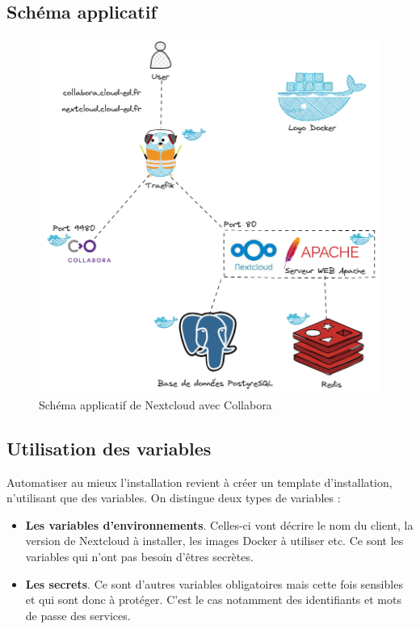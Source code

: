 \documentclass[12pt, a4paper, twoside]{article}
\begin{document}
\newpage
\subsection{Schéma applicatif}
\begin{figure}[!ht]
    \centering
    \includegraphics[width=\textwidth]{src/graph_nextcloud.png}
    \caption{Schéma applicatif de \gls{Nextcloud} avec \gls{Collabora}}
    \label{fig:nextcloudXcollabora}
\end{figure}

\newpage
\subsection{Utilisation des variables}
Automatiser au mieux l'installation revient à créer un template d'installation, n'utilisant que des variables. 
On distingue deux types de variables :
\begin{itemize}
    \item \textbf{Les variables d'environnements}. Celles-ci vont décrire le nom du client, la version de \gls{Nextcloud} à installer, les images Docker à utiliser etc. 
    Ce sont les variables qui n'ont pas besoin d'êtres secrètes.
    \item \textbf{Les secrets}. Ce sont d'autres variables obligatoires mais cette fois sensibles et qui sont donc à protéger.
    C'est le cas notamment des identifiants et mots de passe des services.
\end{itemize}
\end{document}
